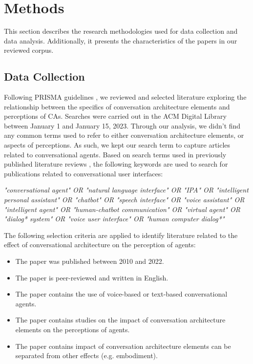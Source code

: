 \documentclass[sigconf,screen,review, anonymous]{acmart}
\begin{document}


\section{Methods}

This section describes the research methodologies used for data collection and data analysis. Additionally, it presents the characteristics of the papers in our reviewed corpus.

\subsection{Data Collection}

Following PRISMA guidelines \cite{prisma}, we reviewed and selected literature exploring the relationship between the specifics of conversation architecture elements and perceptions of CAs. Searches were carried out in the ACM Digital Library between January 1 and January 15, 2023. Through our analysis, we didn't find any common terms used to refer to either conversation architecture elements, or aspects of perceptions. As such, we kept our search term to capture articles related to conversational agents. Based on search terms used in previously published literature reviews \cite{clark2019state}\cite{rapp2021human}, the following keywords are used to search for publications related to conversational user interfaces:
\newline

\textit{"conversational agent" OR "natural language interface" OR "IPA" OR "intelligent personal assistant" OR "chatbot" OR "speech interface" OR "voice assistant" OR "intelligent agent" OR "human-chatbot communication" OR "virtual agent" OR "dialog* system" OR "voice user interface" OR "human computer dialog*"}
\newline

The following selection criteria are applied to identify literature related to the effect of conversational architecture on the perception of agents:
\begin{itemize}
  \item The paper was published between 2010 and 2022.
  \item The paper is peer-reviewed and written in English.
  \item The paper contains the use of voice-based or text-based conversational agents.
  \item The paper contains studies on the impact of conversation architecture elements on the perceptions of agents.
  \item The paper contains impact of conversation architecture elements can be separated from other effects (e.g. embodiment).

\end{itemize}
\end{document}
